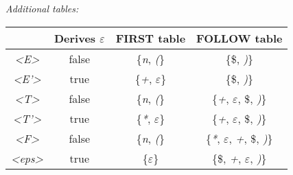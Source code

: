 \documentclass[10pt,a1paper]{memoir}
\begin{document}
\begin{center}
\textsl{Additional tables:}

\begin{tabular}{ |c||c|c|c| }
\hline
 & Derives $\varepsilon$ & FIRST table & FOLLOW table \\
\hline\hline
\textsl{\textless E\textgreater} & false & \{\textit{n}, \textit{(}\} & \{\$, \textit{)}\}\\ \hline
\textsl{\textless E'\textgreater} & true & \{\textit{+}, $\varepsilon$\} & \{\$, \textit{)}\}\\ \hline
\textsl{\textless T\textgreater} & false & \{\textit{n}, \textit{(}\} & \{\textit{+}, $\varepsilon$, \$, \textit{)}\}\\ \hline
\textsl{\textless T'\textgreater} & true & \{\textit{*}, $\varepsilon$\} & \{\textit{+}, $\varepsilon$, \$, \textit{)}\}\\ \hline
\textsl{\textless F\textgreater} & false & \{\textit{n}, \textit{(}\} & \{\textit{*}, $\varepsilon$, \textit{+}, \$, \textit{)}\}\\ \hline
\textsl{\textless eps\textgreater} & true & \{$\varepsilon$\} & \{\$, \textit{+}, $\varepsilon$, \textit{)}\}\\
\hline
\end{tabular}

\end{center}     
\end{document}
